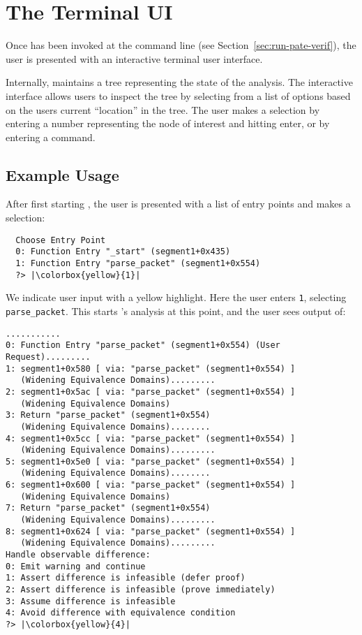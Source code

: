 \section{The \pate{} Terminal UI}
\label{sec:terminal-ui}

Once \pate{} has been invoked at the command line (see Section~\ref{sec:run-pate-verif}), the user is presented with an interactive terminal user interface.

Internally, \pate{} maintains a tree representing the state of the analysis.
The interactive interface allows users to inspect the tree by selecting from a list of options based on the users current ``location'' in the tree.
The user makes a selection by entering a number representing the node of interest and hitting enter, or by entering a command.

\subsection{Example Usage}

After first starting \pate{}, the user is presented with a list of entry points and makes a selection:
\begin{lstlisting}
  Choose Entry Point
  0: Function Entry "_start" (segment1+0x435)
  1: Function Entry "parse_packet" (segment1+0x554)
  ?> |\colorbox{yellow}{1}|
\end{lstlisting}

We indicate user input with a yellow highlight.
Here the user enters \texttt{1}, selecting \texttt{parse\_packet}.
This starts \pate{}'s analysis at this point, and the user sees output of:

\begin{lstlisting}
...........
0: Function Entry "parse_packet" (segment1+0x554) (User Request).........
1: segment1+0x580 [ via: "parse_packet" (segment1+0x554) ]
   (Widening Equivalence Domains).........
2: segment1+0x5ac [ via: "parse_packet" (segment1+0x554) ]
   (Widening Equivalence Domains)
3: Return "parse_packet" (segment1+0x554)
   (Widening Equivalence Domains)........
4: segment1+0x5cc [ via: "parse_packet" (segment1+0x554) ]
   (Widening Equivalence Domains).........
5: segment1+0x5e0 [ via: "parse_packet" (segment1+0x554) ]
   (Widening Equivalence Domains)........
6: segment1+0x600 [ via: "parse_packet" (segment1+0x554) ]
   (Widening Equivalence Domains)
7: Return "parse_packet" (segment1+0x554)
   (Widening Equivalence Domains).........
8: segment1+0x624 [ via: "parse_packet" (segment1+0x554) ]
   (Widening Equivalence Domains).........
Handle observable difference:
0: Emit warning and continue
1: Assert difference is infeasible (defer proof)
2: Assert difference is infeasible (prove immediately)
3: Assume difference is infeasible
4: Avoid difference with equivalence condition
?> |\colorbox{yellow}{4}|
\end{lstlisting}

